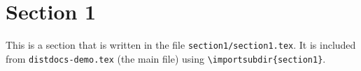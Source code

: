 \section{Section 1}

This is a section that is written in the file
\texttt{section1/section1.tex}.
It is included from \texttt{distdocs-demo.tex} (the main file) using
\texttt{\textbackslash importsubdir\{section1\}}.

